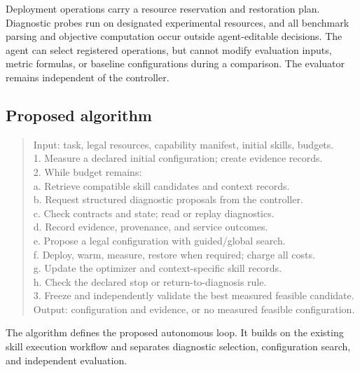 \documentclass[preprint,12pt]{elsarticle}
\begin{document}
Deployment operations carry a resource reservation and restoration plan. Diagnostic probes run on designated experimental resources, and all benchmark parsing and objective computation occur outside agent-editable decisions. The agent can select registered operations, but cannot modify evaluation inputs, metric formulas, or baseline configurations during a comparison. The evaluator remains independent of the controller.

\subsection{Proposed algorithm}
\begin{quote}\small\raggedright
Input: task, legal resources, capability manifest, initial skills, budgets.\\
1. Measure a declared initial configuration; create evidence records.\\
2. While budget remains:\\
\hspace*{1em}a. Retrieve compatible skill candidates and context records.\\
\hspace*{1em}b. Request structured diagnostic proposals from the controller.\\
\hspace*{1em}c. Check contracts and state; read or replay diagnostics.\\
\hspace*{1em}d. Record evidence, provenance, and service outcomes.\\
\hspace*{1em}e. Propose a legal configuration with guided/global search.\\
\hspace*{1em}f. Deploy, warm, measure, restore when required; charge all costs.\\
\hspace*{1em}g. Update the optimizer and context-specific skill records.\\
\hspace*{1em}h. Check the declared stop or return-to-diagnosis rule.\\
3. Freeze and independently validate the best measured feasible candidate.\\
Output: configuration and evidence, or no measured feasible configuration.
\end{quote}
The algorithm defines the proposed autonomous loop. It builds on the existing skill execution workflow and separates diagnostic selection, configuration search, and independent evaluation.
\end{document}

